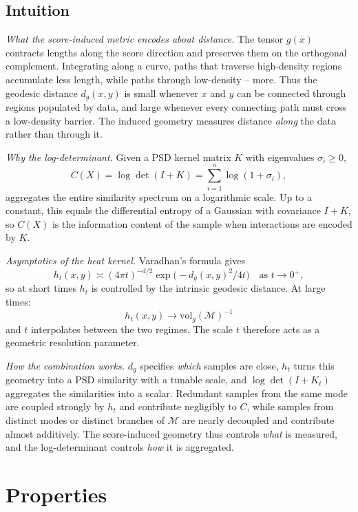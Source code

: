 \documentclass{article}
\newcommand{\M}{\mathcal{M}}
\begin{document}
\subsection{Intuition} 

\emph{What the score-induced metric encodes about distance.}
The tensor \(g(x)\) contracts lengths along the score direction and preserves them on the orthogonal complement. Integrating along a curve, paths that traverse high-density regions accumulate less length, while paths through low-density -- more. Thus the geodesic distance \(d_g(x,y)\) is small whenever \(x\) and \(y\) can be connected through regions populated by data, and large whenever every connecting path must cross a low-density barrier. The induced geometry measures distance \emph{along} the data rather than through it.

\emph{Why the log-determinant.}
Given a PSD kernel matrix \(K\) with eigenvalues \(\sigma_i\geq 0\),
\[
C(X)=\log\det(I+K)=\sum_{i=1}^{n}\log(1+\sigma_i),
\]
aggregates the entire similarity spectrum on a logarithmic scale. Up to a constant, this equals the differential entropy of a Gaussian with covariance \(I+K\), so \(C(X)\) is the information content of the sample when interactions are encoded by \(K\).

\emph{Asymptotics of the heat kernel.}
Varadhan's formula \citep{varadhan1967short} gives
\[
h_t(x,y)\asymp (4\pi t)^{-d/2}\exp\!\bigl(-d_g(x,y)^2/4t\bigr)\quad\text{as }t\to 0^+,
\]
so at short times \(h_t\) is controlled by the intrinsic geodesic distance. At large times:
\[
h_t(x,y)\to\mathrm{vol}_g(\M)^{-1}
\]
and \(t\) interpolates between the two regimes. The scale \(t\) therefore acts as a geometric resolution parameter.

\emph{How the combination works.}
\(d_g\) specifies \emph{which} samples are close, \(h_t\) turns this geometry into a PSD similarity with a tunable scale, and \(\log\det(I+K_t)\) aggregates the similarities into a scalar. Redundant samples from the same mode are coupled strongly by \(h_t\) and contribute negligibly to \(C\), while samples from distinct modes or distinct branches of \(\M\) are nearly decoupled and contribute almost additively. The score-induced geometry thus controls \emph{what} is measured, and the log-determinant controls \emph{how} it is aggregated.
\section{Properties}\label{sec:properties}
\end{document}
